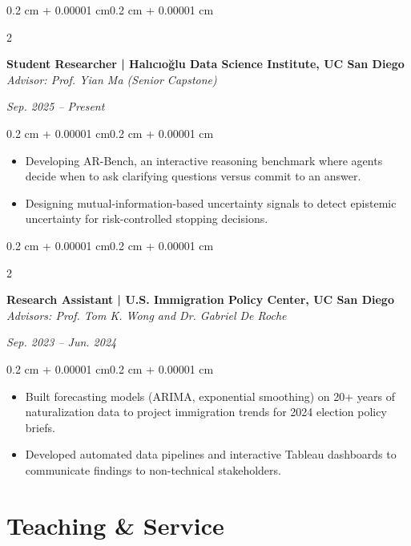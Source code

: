 \documentclass[10pt, letterpaper]{article}
\newenvironment{highlights}{
    \begin{itemize}[
        topsep=0.10 cm,
        parsep=0.10 cm,
        partopsep=0pt,
        itemsep=0pt,
        leftmargin=0.4 cm + 10pt
    ]
}{\end{itemize}}
\newenvironment{onecolentry}{
    \begin{adjustwidth}{0.2 cm + 0.00001 cm}{0.2 cm + 0.00001 cm}
}{\end{adjustwidth}}
\newenvironment{twocolentry}[2][]{
    \onecolentry
    \def\secondColumn{#2}
    \setcolumnwidth{\fill, 4.5 cm}
    \begin{paracol}{2}
}{
    \switchcolumn \raggedleft \secondColumn
    \end{paracol}
    \endonecolentry
}
\begin{document}
    \begin{twocolentry}{\textit{Sep. 2025 -- Present}}
        \textbf{Student Researcher | Halıcıo\u{g}lu Data Science Institute, UC San Diego}\\
        \textit{Advisor: Prof. Yian Ma (Senior Capstone)}
    \end{twocolentry}
    \vspace{0.10 cm}
    \begin{onecolentry}
        \begin{highlights}
            \item Developing AR-Bench, an interactive reasoning benchmark where agents decide when to ask clarifying questions versus commit to an answer.
            \item Designing mutual-information-based uncertainty signals to detect epistemic uncertainty for risk-controlled stopping decisions.
        \end{highlights}
    \end{onecolentry}
    \vspace{0.20 cm}

    \begin{twocolentry}{\textit{Sep. 2023 -- Jun. 2024}}
        \textbf{Research Assistant | U.S. Immigration Policy Center, UC San Diego}\\
        \textit{Advisors: Prof. Tom K. Wong and Dr. Gabriel De Roche}
    \end{twocolentry}
    \vspace{0.10 cm}
    \begin{onecolentry}
        \begin{highlights}
            \item Built forecasting models (ARIMA, exponential smoothing) on 20+ years of naturalization data to project immigration trends for 2024 election policy briefs.
            \item Developed automated data pipelines and interactive Tableau dashboards to communicate findings to non-technical stakeholders.
        \end{highlights}
    \end{onecolentry}

    \section{Teaching \& Service}
\end{document}
